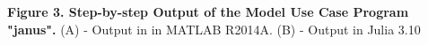 \textbf{Figure 3. Step-by-step Output of the Model Use Case Program "janus".} (A) - Output in  in MATLAB R2014A. (B) - Output in Julia 3.10
  